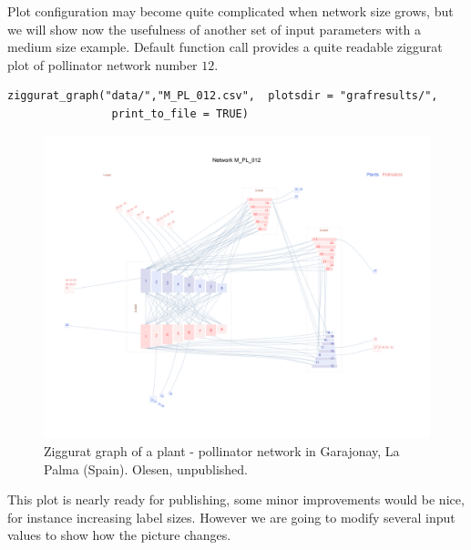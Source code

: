 \documentclass[12pt]{article}
\begin{document}
\clearpage
Plot configuration may become quite complicated when network size grows, but we will show now the usefulness of another set
of input parameters with a medium size example. Default function call provides a quite readable ziggurat plot of pollinator
network number $12$.

\fontsize{3.5mm}{3.5mm}\selectfont
\begin{verbatim}
ziggurat_graph("data/","M_PL_012.csv",  plotsdir = "grafresults/", 
                print_to_file = TRUE)
\end{verbatim}
\normalsize

\begin{figure}[hp!]
\centering
\includegraphics[scale=0.4]{M_PL_012_ziggurat.png}
\caption {Ziggurat graph of a plant - pollinator network in Garajonay, La Palma (Spain). Olesen, unpublished.}
\label{fig:KMAN_ziggurat_012}
\end{figure}

This plot is nearly ready for publishing, some minor improvements would be nice, for instance increasing label sizes. However
we are going to modify several input values to show how the picture changes.
\end{document}
